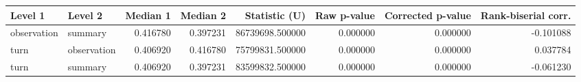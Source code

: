 \begin{tabular}{llrrrrrr}
\toprule
Level 1 & Level 2 & Median 1 & Median 2 & Statistic (U) & Raw p-value & Corrected p-value & Rank-biserial corr. \\
\midrule
observation & summary & 0.416780 & 0.397231 & 86739698.500000 & 0.000000 & 0.000000 & -0.101088 \\
turn & observation & 0.406920 & 0.416780 & 75799831.500000 & 0.000000 & 0.000000 & 0.037784 \\
turn & summary & 0.406920 & 0.397231 & 83599832.500000 & 0.000000 & 0.000000 & -0.061230 \\
\bottomrule
\end{tabular}
